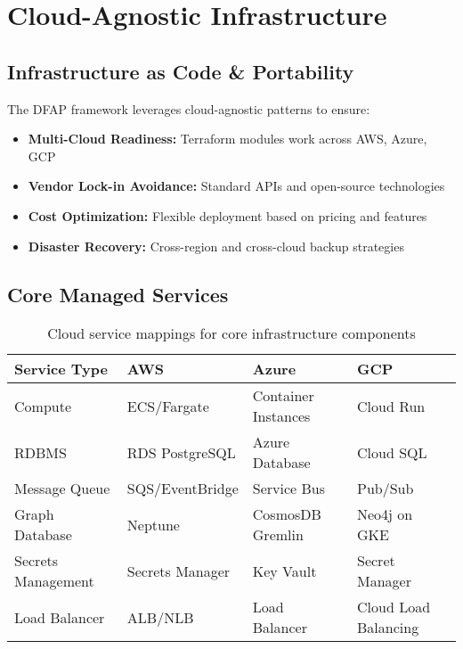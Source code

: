 \section{Cloud-Agnostic Infrastructure}

\subsection{Infrastructure as Code \& Portability}
The DFAP framework leverages cloud-agnostic patterns to ensure:
\begin{itemize}
  \item \textbf{Multi-Cloud Readiness:} Terraform modules work across AWS, Azure, GCP
  \item \textbf{Vendor Lock-in Avoidance:} Standard APIs and open-source technologies
  \item \textbf{Cost Optimization:} Flexible deployment based on pricing and features
  \item \textbf{Disaster Recovery:} Cross-region and cross-cloud backup strategies
\end{itemize}

\subsection{Core Managed Services}
\begin{table}[h]
\centering
\begin{tabular}{|l|l|l|l|}
\hline
\textbf{Service Type} & \textbf{AWS} & \textbf{Azure} & \textbf{GCP} \\
\hline
Compute & ECS/Fargate & Container Instances & Cloud Run \\
\hline
RDBMS & RDS PostgreSQL & Azure Database & Cloud SQL \\
\hline
Message Queue & SQS/EventBridge & Service Bus & Pub/Sub \\
\hline
Graph Database & Neptune & CosmosDB Gremlin & Neo4j on GKE \\
\hline
Secrets Management & Secrets Manager & Key Vault & Secret Manager \\
\hline
Load Balancer & ALB/NLB & Load Balancer & Cloud Load Balancing \\
\hline
\end{tabular}
\caption{Cloud service mappings for core infrastructure components}
\end{table}

